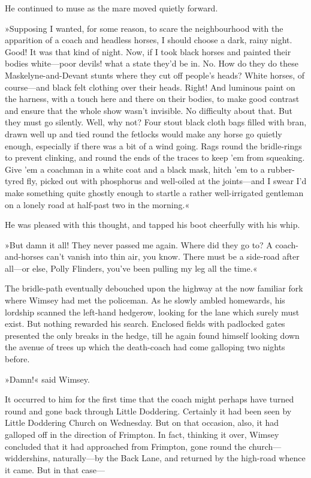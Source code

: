 He continued to muse as the mare moved quietly forward.

»Supposing I wanted, for some reason, to scare the neighbourhood with the apparition of a coach and headless horses, I should choose a dark, rainy night. Good! It was that kind of night. Now, if I took black horses and painted their bodies white—poor devils! what a state they'd be in. No. How do they do these Maskelyne-and-Devant stunts where they cut off people's heads? White horses, of course—and black felt clothing over their heads. Right! And luminous paint on the harness, with a touch here and there on their bodies, to make good contrast and ensure that the whole show wasn't invisible. No difficulty about that. But they must go silently. Well, why not? Four stout black cloth bags filled with bran, drawn well up and tied round the fetlocks would make any horse go quietly enough, especially if there was a bit of a wind going. Rags round the bridle-rings to prevent clinking, and round the ends of the traces to keep 'em from squeaking. Give 'em a coachman in a white coat and a black mask, hitch 'em to a rubber-tyred fly, picked out with phosphorus and well-oiled at the joints—and I swear I'd make something quite ghostly enough to startle a rather well-irrigated gentleman on a lonely road at half-past two in the morning.«

He was pleased with this thought, and tapped his boot cheerfully with his whip.

»But damn it all! They never passed me again. Where did they go to? A coach-and-horses can't vanish into thin air, you know. There must be a side-road after all—or else, Polly Flinders, you've been pulling my leg all the time.«

The bridle-path eventually debouched upon the highway at the now familiar fork where Wimsey had met the policeman. As he slowly ambled homewards, his lordship scanned the left-hand hedgerow, looking for the lane which surely must exist. But nothing rewarded his search. Enclosed fields with padlocked gates presented the only breaks in the hedge, till he again found himself looking down the avenue of trees up which the death-coach had come galloping two nights before.

»Damn!« said Wimsey.

It occurred to him for the first time that the coach might perhaps have turned round and gone back through Little Doddering. Certainly it had been seen by Little Doddering Church on Wednesday. But on that occasion, also, it had galloped off in the direction of Frimpton. In fact, thinking it over, Wimsey concluded that it had approached from Frimpton, gone round the church—widdershins, naturally—by the Back Lane, and returned by the high-road whence it came. But in that case—

